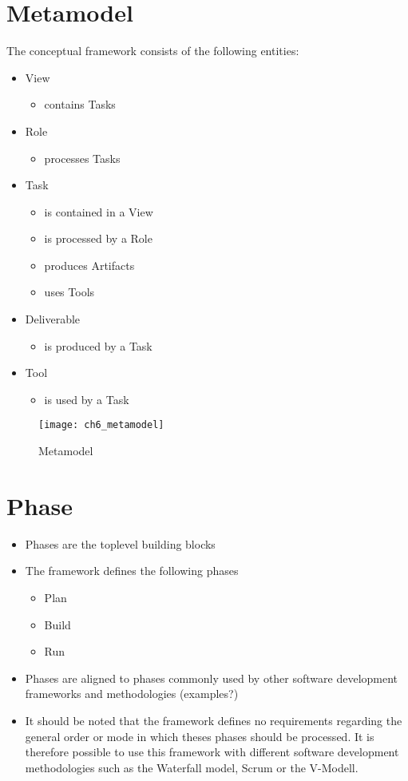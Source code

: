 \section{Metamodel} 
The conceptual framework consists of the following entities:
\begin{itemize}
	\item View
	\begin{itemize}
		\item contains Tasks
	\end{itemize}
	\item Role
	\begin{itemize}
		\item processes Tasks
	\end{itemize}
	\item Task
	\begin{itemize}
		\item is contained in a View
		\item is processed by a Role
		\item produces Artifacts
		\item uses Tools
	\end{itemize}
	\item Deliverable
	\begin{itemize}
		\item is produced by a Task
	\end{itemize}
	\item Tool
	\begin{itemize}
		\item is used by a Task
	\end{itemize}
\end{itemize}

\begin{figure}
	[htpb] \centering 
	\texttt{[image: ch6\_metamodel]} 
	\caption{Metamodel} 
	\label{fig:ch6_metamodel} 
\end{figure}

\section{Phase}

\begin{itemize}
	\item Phases are the toplevel building blocks
	\item The framework defines the following phases
	\begin{itemize}
		\item Plan
		\item Build
		\item Run
	\end{itemize}
	\item Phases are aligned to phases commonly used by other software development frameworks and methodologies (examples?)
	\item It should be noted that the framework defines no requirements regarding the general order or mode in which theses phases should be processed. It is therefore possible to use this framework with different software development methodologies such as the Waterfall model, Scrum or the V-Modell.
\end{itemize}

